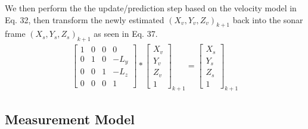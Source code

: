 \documentclass[15pt]{article}
\begin{document}
We then perform the the update/prediction step based on the velocity model in Eq. 32, then transform the newly estimated $(X_{v},Y_{v},Z_{v})_{k+1}$ back into the sonar frame $(X_{s},Y_{s},Z_{s})_{k+1}$ as seen in Eq. 37.
\begin{gather}
\left[\begin{array}{cccc}
1 & 0 & 0 & 0\\
0 & 1 & 0 & -L_{y}\\
0 & 0 & 1 & -L_{z}\\
0 & 0 & 0 & 1
\end{array}\right]*\left[\begin{array}{c}
X_{v}\\
Y_{v}\\
Z_{v}\\
1
\end{array}\right]_{k+1}=\left[\begin{array}{c}
X_{s}\\
Y_{s}\\
Z_{s}\\
1
\end{array}\right]_{k+1}
\end{gather}

\subsection{Measurement Model}
\end{document}
